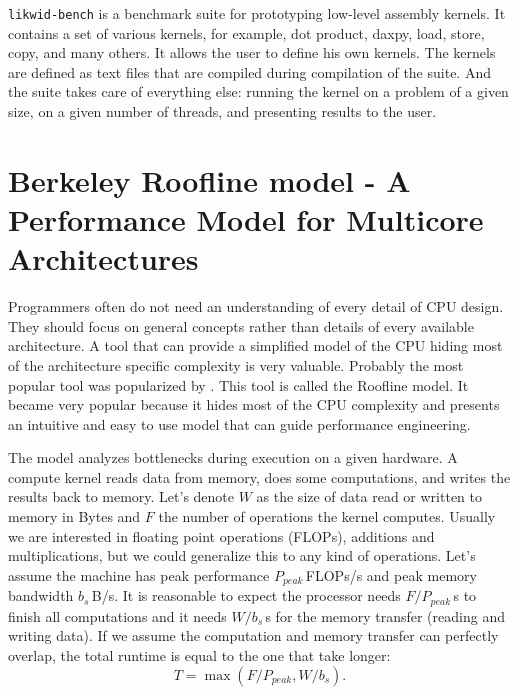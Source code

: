\texttt{likwid-bench} is a benchmark suite for prototyping low-level assembly kernels. 
It contains a set of various kernels, for example, dot product, daxpy, load, store, copy, and many others. It allows the user to define his own kernels. The kernels are defined as text files that are compiled during compilation of the suite. And the suite takes care of everything else: running the kernel on a problem of a given size, on a given number of threads, and presenting results to the user.

\section[Berkeley Roofline model]{Berkeley Roofline model - A Performance Model for Multicore Architectures}

Programmers often do not need an understanding of every detail of CPU design. They should focus on general concepts rather than details of every available architecture. A tool that can provide a simplified model of the CPU hiding most of the architecture specific complexity is very valuable. Probably the most popular tool was popularized by \cite{williams-2009}. This tool is called the Roofline model.
It became very popular because it hides most of the CPU complexity and presents an intuitive and easy to use model that can guide performance engineering.


The model analyzes bottlenecks during execution on a given hardware.
A compute kernel reads data from memory, does some computations, and writes the results back to memory. Let's denote $W$ as the size of data read or written to memory in Bytes and $F$ the number of operations the kernel computes. Usually we are interested in floating point operations (FLOPs), additions and multiplications, but we could generalize this to any kind of operations.
Let's assume the machine has peak performance $P_{peak}$\,FLOPs/s and peak memory bandwidth $b_s$\,B/s.
It is reasonable to expect the processor needs $F/P_{peak}$\,s to finish all computations and it needs $W/b_s$\,s for the memory transfer (reading and writing data). If we assume the computation and memory transfer can perfectly overlap, the total runtime is equal to the one that take longer:
\begin{equation}
    T = \max(F/P_{peak}, W/b_s).
\end{equation}

